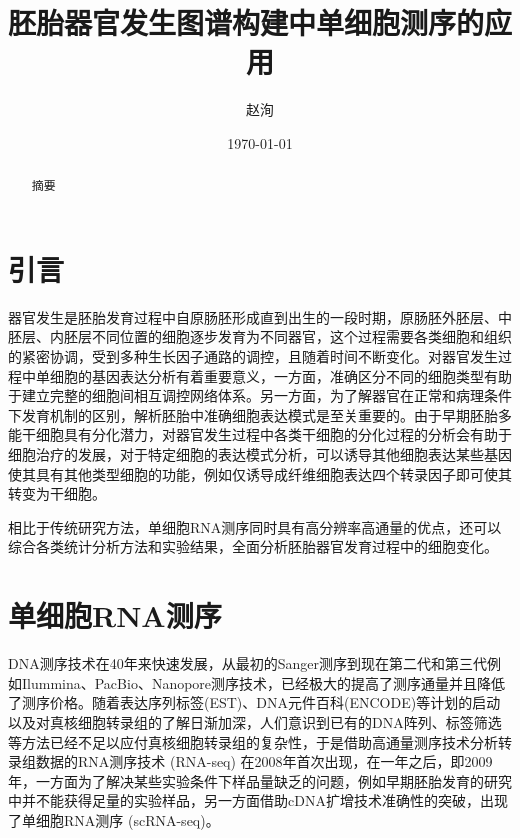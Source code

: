 \documentclass[lang=cn]{elegantpaper}
\title{胚胎器官发生图谱构建中单细胞测序的应用}
\author{赵洵}
\institute{中国科学院大学}
\date{\today}
\begin{document}
\maketitle

\begin{abstract}
摘要
\end{abstract}

\section{引言}
器官发生是胚胎发育过程中自原肠胚形成直到出生的一段时期\citep{gilbert_developmental_2017}，原肠胚外胚层、中胚层、内胚层不同位置的细胞逐步发育为不同器官，这个过程需要各类细胞和组织的紧密协调，受到多种生长因子通路的调控，且随着时间不断变化\citep{zorn_vertebrate_2009}。对器官发生过程中单细胞的基因表达分析有着重要意义，一方面，准确区分不同的细胞类型有助于建立完整的细胞间相互调控网络体系\citep{dong_single-cell_2018}。另一方面，为了解器官在正常和病理条件下发育机制的区别，解析胚胎中准确细胞表达模式是至关重要的\citep{belle_tridimensional_2017}。由于早期胚胎多能干细胞具有分化潜力，对器官发生过程中各类干细胞的分化过程的分析会有助于细胞治疗的发展\citep{lancaster_organogenesis_2014}，对于特定细胞的表达模式分析，可以诱导其他细胞表达某些基因使其具有其他类型细胞的功能，例如仅诱导成纤维细胞表达四个转录因子即可使其转变为干细胞\citep{takahashi_induction_2006}。

相比于传统研究方法，单细胞RNA测序同时具有高分辨率高通量的优点，还可以综合各类统计分析方法和实验结果，全面分析胚胎器官发育过程中的细胞变化。

\section{单细胞RNA测序}
DNA测序技术在40年来快速发展，从最初的Sanger测序到现在第二代和第三代例如Ilummina、PacBio、Nanopore测序技术，已经极大的提高了测序通量并且降低了测序价格\citep{shendure_dna_2017}。随着表达序列标签(EST)、DNA元件百科(ENCODE)等计划的启动以及对真核细胞转录组的了解日渐加深\citep{birney_identification_2007}，人们意识到已有的DNA阵列、标签筛选等方法已经不足以应付真核细胞转录组的复杂性，于是借助高通量测序技术分析转录组数据的RNA测序技术 (RNA-seq) 在2008年首次出现\citep{cloonan_stem_2008}，在一年之后，即2009年，一方面为了解决某些实验条件下样品量缺乏的问题，例如早期胚胎发育的研究中并不能获得足量的实验样品，另一方面借助cDNA扩增技术准确性的突破，出现了单细胞RNA测序 (scRNA-seq)\citep{tang_mrna-seq_2009}。
\end{document}
